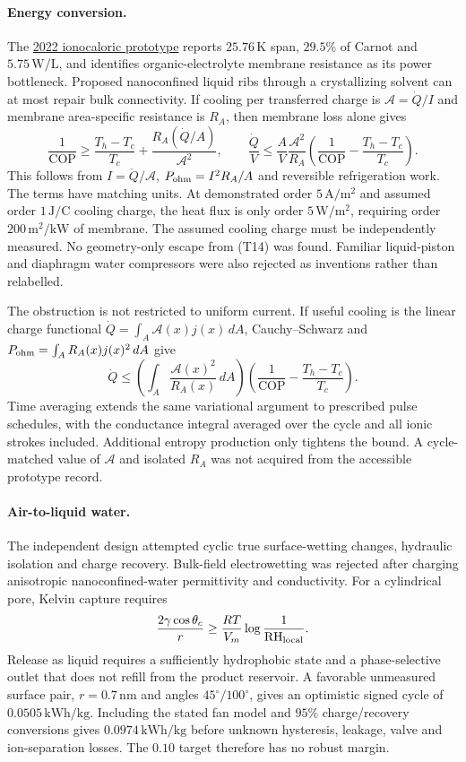 \documentclass[11pt]{article}
\begin{document}
\paragraph{Energy conversion.}
The \href{https://doi.org/10.1126/science.ade1696}{2022 ionocaloric prototype} reports $25.76\,\mathrm K$ span, $29.5\%$ of Carnot and $5.75\,\mathrm{W/L}$, and identifies organic-electrolyte membrane resistance as its power bottleneck. Proposed nanoconfined liquid ribs through a crystallizing solvent can at most repair bulk connectivity. If cooling per transferred charge is $\mathcal A=\dot Q/I$ and membrane area-specific resistance is $R_A$, then membrane loss alone gives
\[
 \frac1{\mathrm{COP}}\ge\frac{T_h-T_c}{T_c}
       +\frac{R_A(\dot Q/A)}{\mathcal A^2},\qquad
 \frac{\dot Q}{V}\le\frac AV\frac{\mathcal A^2}{R_A}
       \left(\frac1{\mathrm{COP}}-\frac{T_h-T_c}{T_c}\right).
 \tag{T14}
\]
This follows from $I=\dot Q/\mathcal A$, $P_{\rm ohm}=I^2R_A/A$ and reversible refrigeration work. The terms have matching units. At demonstrated order $5\,\mathrm{A/m^2}$ and assumed order $1\,\mathrm{J/C}$ cooling charge, the heat flux is only order $5\,\mathrm{W/m^2}$, requiring order $200\,\mathrm{m^2/kW}$ of membrane. The assumed cooling charge must be independently measured. No geometry-only escape from (T14) was found. Familiar liquid-piston and diaphragm water compressors were also rejected as inventions rather than relabelled.

The obstruction is not restricted to uniform current. If useful cooling is the linear charge functional $\dot Q=\int_A\mathcal A(x)j(x)\,dA$, Cauchy--Schwarz and $P_{\rm ohm}=\int_A R_A(x)j(x)^2\,dA$ give
\[
 \dot Q\le\left(\int_A\frac{\mathcal A(x)^2}{R_A(x)}\,dA\right)
       \left(\frac1{\mathrm{COP}}-\frac{T_h-T_c}{T_c}\right).
\]
Time averaging extends the same variational argument to prescribed pulse schedules, with the conductance integral averaged over the cycle and all ionic strokes included. Additional entropy production only tightens the bound. A cycle-matched value of $\mathcal A$ and isolated $R_A$ was not acquired from the accessible prototype record.

\paragraph{Air-to-liquid water.}
The independent design attempted cyclic true surface-wetting changes, hydraulic isolation and charge recovery. Bulk-field electrowetting was rejected after charging anisotropic nanoconfined-water permittivity and conductivity. For a cylindrical pore, Kelvin capture requires
\[
 \frac{2\gamma\cos\theta_c}{r}
       \ge\frac{RT}{V_m}\log\frac1{\mathrm{RH}_{\rm local}}.
\]
Release as liquid requires a sufficiently hydrophobic state and a phase-selective outlet that does not refill from the product reservoir. A favorable unmeasured surface pair, $r=0.7\,\mathrm{nm}$ and angles $45^\circ/100^\circ$, gives an optimistic signed cycle of $0.0505\,\mathrm{kWh/kg}$. Including the stated fan model and $95\%$ charge/recovery conversions gives $0.0974\,\mathrm{kWh/kg}$ before unknown hysteresis, leakage, valve and ion-separation losses. The $0.10$ target therefore has no robust margin.
\end{document}
